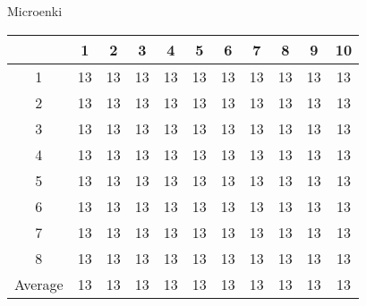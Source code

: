 \begin{center}
    Microenki\\
    \begin{tabular}{ |c|c|c|c|c|c|c|c|c|c|c| }
        \hline
          & 1 & 2 & 3 & 4 & 5 & 6 & 7 & 8 & 9 & 10 \\
        \hline
        \hline
        1 & 13 & 13 & 13 & 13 & 13 & 13 & 13 & 13 & 13 & 13 \\
        2 & 13 & 13 & 13 & 13 & 13 & 13 & 13 & 13 & 13 & 13 \\
        3 & 13 & 13 & 13 & 13 & 13 & 13 & 13 & 13 & 13 & 13 \\
        4 & 13 & 13 & 13 & 13 & 13 & 13 & 13 & 13 & 13 & 13 \\
        5 & 13 & 13 & 13 & 13 & 13 & 13 & 13 & 13 & 13 & 13 \\
        6 & 13 & 13 & 13 & 13 & 13 & 13 & 13 & 13 & 13 & 13 \\
        7 & 13 & 13 & 13 & 13 & 13 & 13 & 13 & 13 & 13 & 13 \\
        8 & 13 & 13 & 13 & 13 & 13 & 13 & 13 & 13 & 13 & 13 \\
        \hline
        \hline
        Average & 13 & 13 & 13 & 13 & 13 & 13 & 13 & 13 & 13 & 13 \\
        \hline
    \end{tabular}
\end{center}

